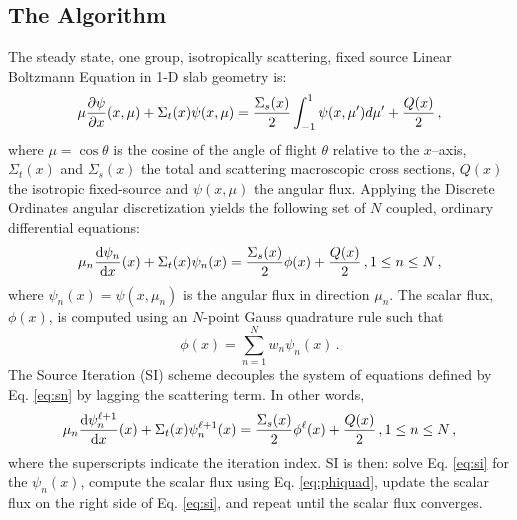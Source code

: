 
\newcommand{\rell}{^\ell} %
\newcommand{\relll}{^{\ell+1}} %
\newcommand{\rellh}{^{\ell+1/2}} %

\subsection{The Algorithm}
The steady state, one group, isotropically scattering, fixed source Linear Boltzmann Equation in 1-D slab geometry is: 
	\begin{equation} \label{eq:bte}
		\mu \frac{\partial \psi}{\partial x}(x, \mu) + \Sigma_t(x) \psi(x,\mu) = 
		\frac{\Sigma_s(x)}{2} \int_{-1}^{1} \psi(x, \mu') d\mu' + \frac{Q(x)}{2} \,,
	\end{equation}
where $\mu = \cos\theta$ is the cosine of the angle of flight $\theta$ relative to the $x$--axis, $\Sigma_t(x)$ and $\Sigma_s(x)$ the total and scattering macroscopic cross sections, $Q(x)$ the isotropic fixed-source and $\psi(x, \mu)$ the angular flux. Applying the Discrete Ordinates angular discretization yields the following set of $N$ coupled, ordinary differential equations: 
	\begin{equation} \label{eq:sn}
		\mu_n \frac{\mathop{}\!\mathrm{d} \psi_n}{\mathop{}\!\mathrm{d} x}(x) + \Sigma_t(x) \psi_n(x) = 
		\frac{\Sigma_s(x)}{2} \phi(x) + \frac{Q(x)}{2} \,, 1 \leq n \leq N \,,
	\end{equation}
where $\psi_n(x) = \psi(x, \mu_n)$ is the angular flux in direction $\mu_n$. The scalar flux, $\phi(x)$, is computed using an $N$-point Gauss quadrature rule such that 
	\begin{equation} \label{eq:phiquad}
		\phi(x) = \sum_{n=1}^N w_n \psi_n(x) \,.
	\end{equation}
The Source Iteration (SI) scheme decouples the system of equations defined by Eq. \ref{eq:sn} by lagging the scattering term. In other words, 
	\begin{equation} \label{eq:si}
		\mu_n \dderiv{\psi_n\relll}{x}(x) + \Sigma_t(x) \psi_n\relll(x) = 
		\frac{\Sigma_s(x)}{2} \phi^\ell(x) + \frac{Q(x)}{2} \,, 1 \leq n \leq N \,,
	\end{equation}
where the superscripts indicate the iteration index. SI is then: solve Eq. \ref{eq:si} for the $\psi_n(x)$, compute the scalar flux using Eq. \ref{eq:phiquad}, update the scalar flux on the right side of Eq. \ref{eq:si}, and repeat until the scalar flux converges. 

